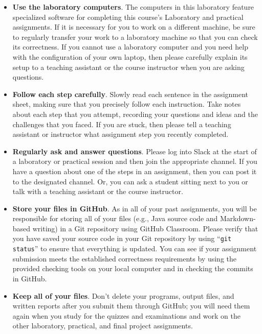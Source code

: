 \documentclass[11pt]{article}
\newcommand{\command}[1]{``\lstinline{#1}''}
\begin{document}
\begin{itemize}
  \setlength{\itemsep}{0pt}

\item {\bf Use the laboratory computers}. The computers in this laboratory feature specialized software for completing
  this course's Laboratory and practical assignments. If it is necessary for you to work on a different machine, be sure
  to regularly transfer your work to a laboratory machine so that you can check its correctness. If you cannot use a
  laboratory computer and you need help with the configuration of your own laptop, then please carefully explain its
  setup to a teaching assistant or the course instructor when you are asking questions.

\item {\bf Follow each step carefully}. Slowly read each sentence in the assignment sheet, making sure that you
  precisely follow each instruction. Take notes about each step that you attempt, recording your questions and ideas and
  the challenges that you faced. If you are stuck, then please tell a teaching assistant or instructor what assignment
  step you recently completed.

\item {\bf Regularly ask and answer questions}. Please log into Slack at the start of a laboratory or practical session
  and then join the appropriate channel. If you have a question about one of the steps in an assignment, then you can
  post it to the designated channel. Or, you can ask a student sitting next to you or talk with a teaching assistant or
  the course instructor.

\item {\bf Store your files in GitHub}. As in all of your past assignments, you will be responsible for storing
  all of your files (e.g., Java source code and Markdown-based writing) in a Git repository using GitHub Classroom.
  Please verify that you have saved your source code in your Git repository by using \command{git status} to ensure that
  everything is updated. You can see if your assignment submission meets the established correctness requirements by
  using the provided checking tools on your local computer and in checking the commits in GitHub.

\item {\bf Keep all of your files}. Don't delete your programs, output files, and written reports after you submit them
  through GitHub; you will need them again when you study for the quizzes and examinations and work on the other
  laboratory, practical, and final project assignments.


\end{itemize}
\end{document}
